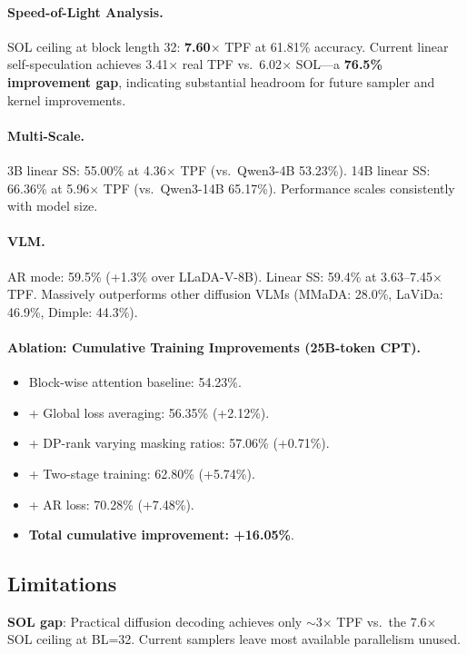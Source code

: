 \documentclass[11pt,a4paper]{article}
\begin{document}
\paragraph{Speed-of-Light Analysis.} SOL ceiling at block length 32: \textbf{7.60$\times$} TPF at 61.81\% accuracy. Current linear self-speculation achieves 3.41$\times$ real TPF vs.\ 6.02$\times$ SOL---a \textbf{76.5\% improvement gap}, indicating substantial headroom for future sampler and kernel improvements.

\paragraph{Multi-Scale.} 3B linear SS: 55.00\% at 4.36$\times$ TPF (vs.\ Qwen3-4B 53.23\%). 14B linear SS: 66.36\% at 5.96$\times$ TPF (vs.\ Qwen3-14B 65.17\%). Performance scales consistently with model size.

\paragraph{VLM.} AR mode: 59.5\% (+1.3\% over LLaDA-V-8B). Linear SS: 59.4\% at 3.63--7.45$\times$ TPF. Massively outperforms other diffusion VLMs (MMaDA: 28.0\%, LaViDa: 46.9\%, Dimple: 44.3\%).

\paragraph{Ablation: Cumulative Training Improvements (25B-token CPT).}
\begin{itemize}
\item Block-wise attention baseline: 54.23\%.
\item + Global loss averaging: 56.35\% (+2.12\%).
\item + DP-rank varying masking ratios: 57.06\% (+0.71\%).
\item + Two-stage training: 62.80\% (+5.74\%).
\item + AR loss: 70.28\% (+7.48\%).
\item \textbf{Total cumulative improvement: +16.05\%}.
\end{itemize}

\subsection{Limitations}

\textbf{SOL gap}: Practical diffusion decoding achieves only $\sim$3$\times$ TPF vs.\ the 7.6$\times$ SOL ceiling at BL=32. Current samplers leave most available parallelism unused.
\end{document}
